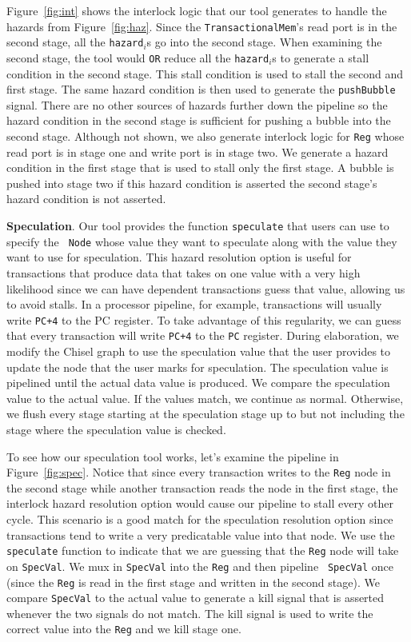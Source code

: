 Figure~\ref{fig:int} shows the interlock logic that our tool
generates to handle the hazards from Figure~\ref{fig:haz}. Since
the {\tt TransactionalMem}'s read port is in the second stage, all the
{\tt hazard$_i$}s go into the second stage. When examining the second
stage, the tool would {\tt OR} reduce all the {\tt hazard}$_i$s to
generate a stall condition in the second stage. This stall condition
is used to stall the second and first stage. The same hazard
condition is then used to generate the {\tt pushBubble} signal. There
are no other sources of hazards further down the pipeline so the
hazard condition in the second stage is sufficient for pushing a
bubble into the second stage. Although not shown, we also generate
interlock logic for {\tt Reg} whose read port is in stage one and
write port is in stage two. We generate a hazard condition in the
first stage that is used to stall only the first stage. A bubble is
pushed into stage two if this hazard condition is asserted the second
stage's hazard condition is not asserted.

{\bf Speculation}. Our tool provides
the function {\tt speculate} that users can use to specify the {\tt
  Node} whose value they want to speculate along with the value they
want to use for speculation. This hazard resolution option is useful
for transactions that produce data that takes on one value with a very
high likelihood since we can have dependent transactions guess that
value, allowing us to avoid stalls. In a processor pipeline, for
example, transactions will usually write {\tt PC+4} to the PC
register. To take advantage of this regularity, we can guess that
every transaction will write {\tt PC+4} to the {\tt PC}
register. During elaboration, we modify the Chisel graph to use the
speculation value that the user provides to update the node that the
user marks for speculation. The speculation value is pipelined until
the actual data value is produced. We compare the speculation value to
the actual value. If the values match, we continue as
normal. Otherwise, we flush every stage starting at the speculation stage
up to but not including the stage where the speculation value is checked.

To see how our speculation tool works, let's examine the pipeline in
Figure~\ref{fig:spec}. Notice that since every
transaction writes to the {\tt Reg} node in the second stage while
another transaction reads the node in the first stage, the interlock
hazard resolution option would cause our pipeline to stall every other
cycle. This scenario is a good match for the speculation resolution
option since transactions tend to write a very predicatable value into
that node. We use the {\tt speculate} function to indicate that we
are guessing that the {\tt Reg} node will take on {\tt SpecVal}. We
mux in {\tt SpecVal} into the {\tt Reg} and then pipeline {\tt
  SpecVal} once (since the {\tt Reg} is read in the first stage and
written in the second stage). We compare {\tt SpecVal} to the actual
value to generate a kill signal that is asserted whenever the two
signals do not match. The kill signal is used to write the correct
value into the {\tt Reg} and we kill stage one.

